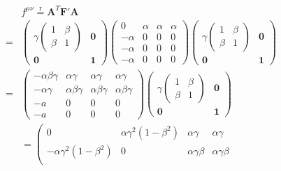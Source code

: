 \documentclass[uplatex,a4j,11pt,dvipdfmx]{jsarticle}
\begin{document}
\begin{align}
  \begin{split}
    &f^{\mu\nu}\overset{\text{r}}{=}{\bm A}^T{\bm F}'{\bm A}\\
    =&\left(\begin{array}{cc}
      \gamma\left(\begin{array}{cc}
        1&\beta\\
        \beta&1
      \end{array}\right)&{\bm 0}\\
      {\bm 0}&{\bm 1}
    \end{array}\right)
    \left(\begin{array}{cccc}
      0&\alpha&\alpha&\alpha\\
      -\alpha&0&0&0\\
      -\alpha&0&0&0\\
      -\alpha&0&0&0
    \end{array}\right)
    \left(\begin{array}{cc}
      \gamma\left(\begin{array}{cc}
        1&\beta\\
        \beta&1
      \end{array}\right)&{\bm 0}\\
      {\bm 0}&{\bm 1}
    \end{array}\right)\\
    =&
    \left(\begin{array}{cccc}
      -\alpha\beta\gamma&\alpha\gamma&\alpha\gamma&\alpha\gamma\\
      -\alpha\gamma&\alpha\beta\gamma&\alpha\beta\gamma&\alpha\beta\gamma\\
      -a&0&0&0\\
      -a&0&0&0
    \end{array}\right)
    \left(\begin{array}{cc}
      \gamma\left(\begin{array}{cc}
        1&\beta\\
        \beta&1
      \end{array}\right)&{\bm 0}\\
      {\bm 0}&{\bm 1}
    \end{array}\right)\\
    &=\left(\begin{array}{cccc}
      0&\alpha\gamma^2(1-\beta^2)&\alpha\gamma&\alpha\gamma\\
      -\alpha\gamma^2(1-\beta^2)&0&\alpha\gamma\beta&\alpha\gamma\beta\\

\end{array}
\end{split}
\end{align}
\end{document}
